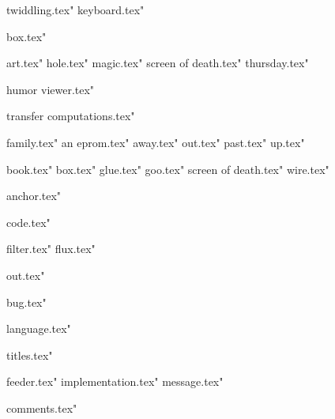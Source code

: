  twiddling.tex"
 keyboard.tex"




 box.tex"


 art.tex"
 hole.tex"
 magic.tex"
 screen of death.tex"
 thursday.tex"




 humor viewer.tex"









 transfer computations.tex"

 family.tex"
 an eprom.tex"
 away.tex"
 out.tex"
 past.tex"
 up.tex"

 book.tex"
 box.tex"
 glue.tex"
 goo.tex"
 screen of death.tex"
 wire.tex"




 anchor.tex"

 code.tex"





 filter.tex"
 flux.tex"



 out.tex"

 bug.tex"


 language.tex"

 titles.tex"




 feeder.tex"
 implementation.tex"
 message.tex"



 comments.tex"

